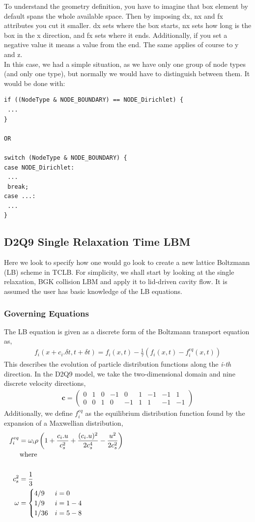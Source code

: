 \documentclass[12pt,a4paper]{report}
\begin{document}
To understand the geometry definition, you have to imagine that box element by default spans the whole available space. Then by imposing dx, nx and fx attributes you cut it smaller. dx sets where the box starts, nx sets how long is the box in the x direction, and fx sets where it ends. Additionally, if you set a negative value it means a value from the end. The same applies of course to y and z.\\

In this case, we had a simple situation, as we have only one group of node types (and only one type), but normally we would have to distinguish between them. It would be done with:
\begin{lstlisting}
if ((NodeType & NODE_BOUNDARY) == NODE_Dirichlet) {
 ...
}

OR

switch (NodeType & NODE_BOUNDARY) {
case NODE_Dirichlet:
 ...
 break;
case ...:
 ...
}
\end{lstlisting}
\newpage
\subsection{D2Q9 Single Relaxation Time LBM}
Here we look to specify how one would go look to create a new lattice Boltzmann (LB) scheme in TCLB. For simplicity, we shall start by looking at the single relaxation, BGK collision LBM and apply it to lid-driven cavity flow. It is assumed the user has basic knowledge of the LB equations.
\subsubsection{Governing Equations}
The LB equation is given as a discrete form of the Boltzmann transport equation as,
\begin{align*}
f_i (x+c_i.\delta t, t+\delta t) = f_i(x,t) - \frac{1}{\tau}(f_i(x,t) - f_i^{eq}(x,t))
\end{align*}
This describes the evolution of particle distribution functions along the \textit{i-th} direction. In the D2Q9 model, we take the two-dimensional domain and nine discrete velocity directions,
\begin{align*}
\mathbf{c} = \begin{pmatrix}
0 & 1 & 0 & -1 & 0 & 1 & -1 & -1 & 1 \\
0 & 0 & 1 & 0 & -1 & 1 & 1 & -1 & -1 
\end{pmatrix}
\end{align*}
Additionally, we define $f_i^{eq}$ as the equilibrium distribution function found by the expansion of a Maxwellian distribution,
\begin{align*}
f_i^{eq} &= \omega_i \rho \left( 1+\frac{c_i.u}{c_s^2} + \frac{(c_i.u)^2}{2c_s^4} - \frac{u^2}{2c_s^2}\right) \\
\noalign{\text{where}} \\
c_s^2 &= \frac{1}{3} \\
\omega &= \begin{cases}
4/9 	& i=0 \\
1/9		& i=1-4 \\
1/36	& i=5-8
\end{cases}
\end{align*}
\end{document}
